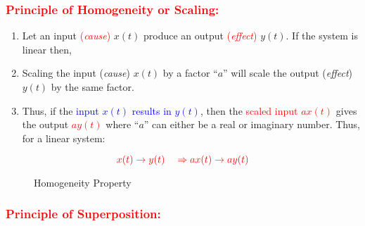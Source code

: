 \documentclass[../notes-main.tex]{subfiles}
\begin{document}
\subsubsection{\textcolor{red}{Principle of Homogeneity or Scaling:}}
\begin{enumerate}[label=\blacktriangleright, leftmargin=*, itemsep=0.5em]
    \item Let an input \textcolor{red}{(\emph{cause})} \(x(t)\) produce an output \textcolor{red}{(\emph{effect})} \(y(t)\). If the system is linear then,
    \item Scaling the input (\emph{cause}) \(x(t)\) by a factor ``\(a\)'' will scale the output (\emph{effect}) \(y(t)\) by the same factor.
    \item Thus, if the \textcolor{blue}{input \(x(t)\) results in \(y(t)\)}, then the \textcolor{red}{scaled input \(ax(t)\)} gives the output \textcolor{red}{\(ay(t)\)} where ``\(a\)'' can either be a real or imaginary number. Thus, for a linear system:
\end{enumerate}
\begin{equation}
    \textcolor{red}{x(t) \rightarrow y(t) \quad \Rightarrow ax(t) \rightarrow ay(t)}
\end{equation}\label{eq:linear-system-homogeneity-property}
\begin{figure}[H]
    \centering
    \begin{mdframed}
        \begin{center}
        \end{center}
    \end{mdframed}
    \vspace{-1em}\caption{Homogeneity Property}\label{fig:homogeneity-property-def-1}
\end{figure}
\newpage
\subsubsection{\textcolor{red}{Principle of Superposition:}}
\end{document}
